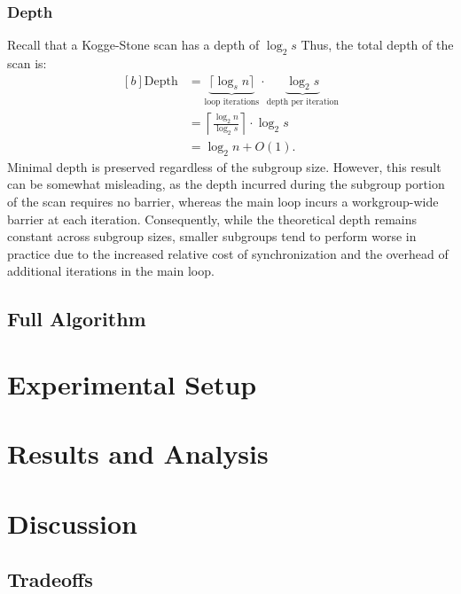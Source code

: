 \documentclass[sigconf]{acmart}
\begin{document}
\subsubsection{Depth}
Recall that a Kogge-Stone scan has a depth of $\log_2 s$ Thus, the total depth of the scan is:
\begin{equation}
  \begin{aligned}[b]
    \text{Depth} & = \underbrace{\lceil \log_s n \rceil}_{\text{loop iterations}}
    \cdot \underbrace{\log_2 s}_{\text{depth per iteration}}                           \\
                 & = \left\lceil \frac{\log_2 n}{\log_2 s} \right\rceil \cdot \log_2 s \\
                 & = \log_2 n + O(1).
  \end{aligned}
\end{equation}
Minimal depth is preserved regardless of the subgroup size. However, this result can be somewhat misleading, as the depth incurred during the subgroup portion of the scan requires no barrier, whereas the main loop incurs a workgroup-wide barrier at each iteration. Consequently, while the theoretical depth remains constant across subgroup sizes, smaller subgroups tend to perform worse in practice due to the increased relative cost of synchronization and the overhead of additional iterations in the main loop.
\subsection{Full Algorithm}

\section{Experimental Setup}

\section{Results and Analysis}

\section{Discussion}

\subsection{Tradeoffs}
\end{document}

